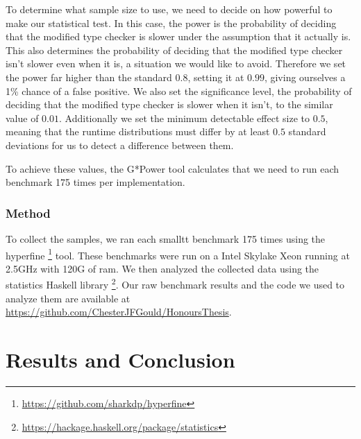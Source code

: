 \documentclass[sigplan]{acmart}
\begin{document}
To determine what sample size to use, we need to decide on how powerful to make our statistical test.
In this case, the power is the probability of deciding that the modified type checker is slower under the assumption that it actually is.
This also determines the probability of deciding that the modified type checker isn't slower even when it is, a situation we would like to avoid.
Therefore we set the power far higher than the standard $0.8$, setting it at $0.99$, giving ourselves a 1\% chance of a false positive.
We also set the significance level, the probability of deciding that the modified type checker is slower when it isn't, to the similar value of $0.01$.
Additionally we set the minimum detectable effect size to $0.5$, meaning that the runtime distributions must differ by at least $0.5$ standard deviations for us to detect a difference between them.

To achieve these values, the G*Power tool \citep{Faul2009} calculates that we need to run each benchmark 175 times per implementation.

\subsubsection{Method}
To collect the samples, we ran each smalltt benchmark 175 times using the hyperfine \footnote{\url{https://github.com/sharkdp/hyperfine}} tool.
These benchmarks were run on a Intel Skylake Xeon running at 2.5GHz with 120G of ram.
We then analyzed the collected data using the statistics Haskell library \footnote{\url{https://hackage.haskell.org/package/statistics}}.
Our raw benchmark results and the code we used to analyze them are available at \url{https://github.com/ChesterJFGould/HonoursThesis}.

\section{Results and Conclusion}
\end{document}
